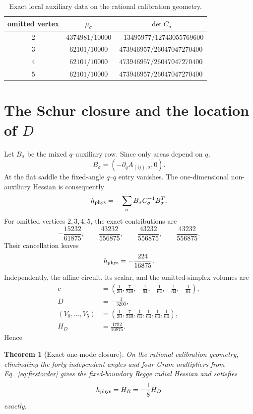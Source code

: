 \documentclass[11pt]{article}
\newtheorem{theorem}{Theorem}[section]
\theoremstyle{definition}
\theoremstyle{remark}
\begin{document}
\begin{table}[t]
\centering
\caption{Exact local auxiliary data on the rational calibration geometry.}
\label{tab:determinants}
\begin{tabular}{ccc}
\toprule
omitted vertex & $\mu_\sigma$ & $\det C_\sigma$\\
\midrule
$2$ & $4374981/10000$ & $-13495977/12743055769600$\\
$3$ & $62101/10000$ & $473946957/26047047270400$\\
$4$ & $62101/10000$ & $473946957/26047047270400$\\
$5$ & $62101/10000$ & $473946957/26047047270400$\\
\bottomrule
\end{tabular}
\end{table}

\section{The Schur closure and the location of \texorpdfstring{$D$}{D}}

Let $B_\sigma$ be the mixed $q$--auxiliary row.  Since only areas depend on $q$,
\begin{equation}
 B_\sigma=\left(-\partial_q A_{(ij),\sigma},0\right).
\end{equation}
At the flat saddle the fixed-angle $q$--$q$ entry vanishes.  The one-dimensional non-auxiliary Hessian is consequently
\begin{equation}
 h_{\rm phys}=-\sum_\sigma B_\sigma C_\sigma^{-1}B_\sigma^T.
 \label{eq:schur}
\end{equation}
For omitted vertices $2,3,4,5$, the exact contributions are
\begin{equation}
 -\frac{15232}{61875},\qquad
 \frac{43232}{556875},\qquad
 \frac{43232}{556875},\qquad
 \frac{43232}{556875}.
\end{equation}
Their cancellation leaves
\begin{equation}
 h_{\rm phys}=-\frac{224}{16875}.
 \label{eq:hphys}
\end{equation}
Independently, the affine circuit, its scalar, and the omitted-simplex volumes are
\begin{align}
 c&=\left(\frac1{30},\frac7{240},-\frac1{64},-\frac1{64},-\frac1{64},-\frac1{64}\right),\\
 D&=-\frac1{3200},\\
 (V_0,\ldots,V_5)&=\left(\frac1{30},\frac7{240},\frac1{64},\frac1{64},\frac1{64},\frac1{64}\right),\\
 H_D&=\frac{1792}{16875}.
\end{align}
Hence
\begin{theorem}[Exact one-mode closure]
On the rational calibration geometry, eliminating the forty independent angles and four Gram multipliers from Eq.~\eqref{eq:firstorder} gives the fixed-boundary Regge radial Hessian and satisfies
\begin{equation}
 h_{\rm phys}=H_R=-\frac18H_D
\end{equation}
exactly.
\end{theorem}
\end{document}
